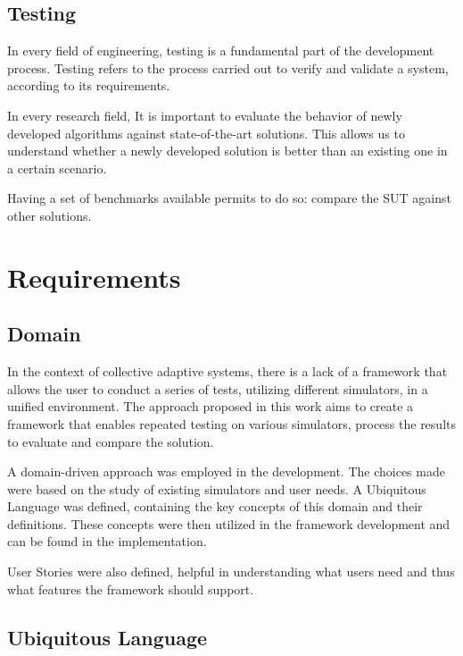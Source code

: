 \documentclass[12pt,a4paper,openright,twoside]{book}
\begin{document}
\section{Testing}

In every field of engineering, testing is a fundamental part of the development process.
Testing refers to the process carried out to verify and validate a system, according to its requirements. \cite{Spillner2011}

In every research field, It is important to evaluate the behavior of newly developed algorithms against state-of-the-art solutions.
This allows us to understand whether a newly developed solution is better than an existing one in a certain scenario.

Having a set of benchmarks available permits to do so: compare the \ac{SUT} against other solutions.

\chapter{Requirements}

\section{Domain}

In the context of collective adaptive systems, there is a lack of a framework that allows the user to conduct a series of tests, utilizing different simulators, in a unified environment. 
The approach proposed in this work aims to create a framework that enables repeated testing on various simulators, process the results to evaluate and compare the solution.

A domain-driven approach was employed in the development. The choices made were based on the study of existing simulators and user needs. A Ubiquitous Language was defined, containing the key concepts of this domain and their definitions. 
These concepts were then utilized in the framework development and can be found in the implementation.

User Stories were also defined, helpful in understanding what users need and thus what features the framework should support.

\section{Ubiquitous Language}
\end{document}
